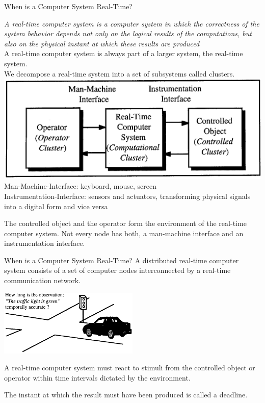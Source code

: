 \begin{frame}{When is a Computer System Real-Time?}

\textit{A real-time computer system is a computer system in which the
correctness of the system behavior depends not only on the logical
results of the computations, but also on the physical instant at which
these results are produced}\\
A real-time computer system is always part of a larger system, the
real-time system.\\
We decompose a real-time system into a set of subsystems called
clusters.
\includegraphics[width=1.0\textwidth]{media/Fig_1_1.png}
Man-Machine-Interface: keyboard, mouse, screen\\
Instrumentation-Interface: sensors and actuators, transforming physical
signals into a digital form and vice versa


The controlled object and the operator form the environment of the
real-time computer system. Not every node has both, a man-machine
interface and an instrumentation interface.

\end{frame}

\begin{frame}{When is a Computer System Real-Time?}
A distributed real-time computer system consists of a set of computer
nodes interconnected by a real-time communication network.

\includegraphics[width=0.5\textwidth]{media/Fig_1_2.png}

A real-time computer system must react to stimuli from the controlled
object or operator within time intervals dictated by the environment.

The instant at which the result must have been produced is called a
deadline.
\end{frame}

